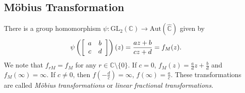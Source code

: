 \subsection{M\"obius Transformation}
There is a group homomorphism
$\psi : \mathrm{GL}_2(\mathbb{C}) \to \mathrm{Aut}(\hat{\mathbb{C}})$
given by
$$
  \psi\left(
    \left[
      \begin{array}{c c}
        a & b \\
        c & d
      \end{array}
    \right]
  \right)(z)
= \frac{a z + b}{c z + d}
= f_M(z).
$$
We note that $f_{rM} = f_M$
for any $r \in \mathbb{C} \setminus \{ 0 \}$.
If $c = 0$, $f_M(z) = \frac{a}{d} z + \frac{b}{d}$
and $f_M(\infty) = \infty$. If $c \neq 0$, then
$f(-\frac{d}{c}) = \infty$, $f(\infty) = \frac{a}{c}$.
These transformations are called \emph{M\"obius transformations}
or \emph{linear fractional transformations}.

